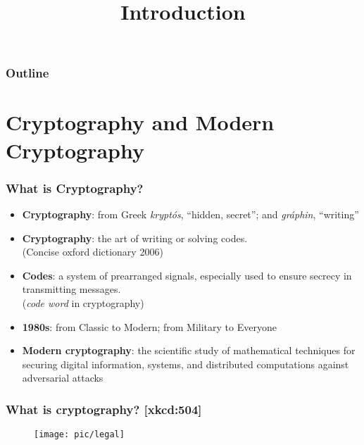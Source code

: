 

\title{Introduction}


\maketitle
\begin{frame}
\frametitle{Outline}
\tableofcontents
\end{frame}
\section{Cryptography and Modern Cryptography}
\begin{frame}\frametitle{What is Cryptography?}
\begin{itemize}
\item \textbf{Cryptography}: from Greek \emph{krypt\'os}, ``hidden, secret''; and \emph{gr\'{a}phin}, ``writing''
\item \textbf{Cryptography}: the art of writing or solving codes.\\ (Concise oxford dictionary 2006)
\item \textbf{Codes}: a system of prearranged signals, especially used to ensure secrecy in transmitting messages. \\ (\emph{code word} in cryptography)
\item \textbf{1980s}: from Classic to Modern; from Military to Everyone
\item \textbf{Modern cryptography}: the scientific study of mathematical techniques for securing digital information, systems, and distributed computations against adversarial attacks
\end{itemize}
\end{frame}
\begin{frame}\frametitle{What is cryptography? [xkcd:504]}
\begin{figure}
\begin{center}
\texttt{[image: pic/legal]} 
\end{center}
\end{figure}
\end{frame}
